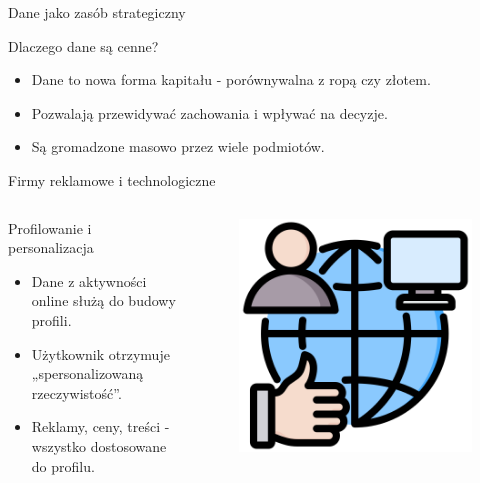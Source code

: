     
    \begin{frame}{Dane jako zasób strategiczny}
    \begin{alertblock}{Dlaczego dane są cenne?}
        \begin{itemize}
          \item Dane to nowa forma kapitału - porównywalna z ropą czy złotem.
          \item Pozwalają przewidywać zachowania i wpływać na decyzje.
          \item Są gromadzone masowo przez wiele podmiotów.
        \end{itemize}
    \end{alertblock}
    \end{frame}
    
    
    \begin{frame}{Firmy reklamowe i technologiczne}
    \begin{columns}[c]
        \begin{alertblock}{Profilowanie i personalizacja}
            \begin{itemize}
              \item Dane z aktywności online służą do budowy profili.
              \item Użytkownik otrzymuje „spersonalizowaną rzeczywistość”.
              \item Reklamy, ceny, treści - wszystko dostosowane do profilu. \cite{EFF}
            \end{itemize}
        \end{alertblock}
        \begin{figure}
          \centering
          \includegraphics[height=0.45\textheight]{images/social-network.png}
        \end{figure}
    \end{columns}
    \end{frame}
    
